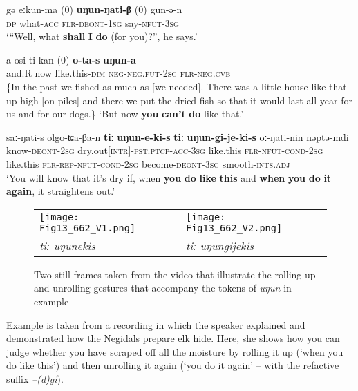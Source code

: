 \documentclass[output=paper]{langscibook}
\begin{document}
\ea \label{ex:pakendorf:34}
\gll gə eːkun-ma \textup{(0)} \textbf{uŋun-ŋati-β} \textup{(0)} gun-ə-n\\
\textsc{dp} what-\textsc{acc} {} \textsc{flr-deont-1sg} {} say-\textsc{nfut-3sg}\\
\glt ‘“Well, what \textbf{shall} \textbf{I} \textbf{do} (for you)?”, he says.’ 
\z

\ea \label{ex:pakendorf:35}
\gll a
	osi
	ti-kan
	\textup{(0)}
	\textbf{o-ta-s}
	\textbf{uŋun-a}\\
	and.R
	now
	like.this-\textsc{dim}
	{}
	\textsc{neg-neg.fut-2sg}
	\textsc{flr-neg.cvb}\\
\glt \{In the past we fished as much as [we needed]. There was a little house like that up high [on piles] and there we put the dried fish so that it would last all year for us and for our dogs.\} ‘But now \textbf{you} \textbf{can't} \textbf{do} like that.’ 
\z


\ea \label{ex:pakendorf:36}
\gll saː-ŋati-s olgo-ʨa-βa-n \textbf{tiː} \textbf{uŋun-e-ki-s} \textbf{tiː} \textbf{uŋun-gi-je-ki-s} oː-ŋati-nin nəptə-mdi\\
know-\textsc{deont-2sg} dry.out\textsc{[intr]-pst.ptcp-acc-3sg} like.this \textsc{flr-nfut-cond-2sg} like.this \textsc{flr-rep-nfut-cond-2sg} become-\textsc{deont-3sg} smooth-\textsc{ints.adj}\\
\glt ‘You will know that it's dry if, when \textbf{you} \textbf{do} \textbf{like} \textbf{this} and \textbf{when} \textbf{you} \textbf{do} \textbf{it} \textbf{again}, it straightens out.’ 
\z


\begin{figure}
\begin{tabularx}{\textwidth}{XX}
\texttt{[image: Fig13\_662\_V1.png]} & 
\texttt{[image: Fig13\_662\_V2.png]}
\\
\textit{tiː uŋunekis} & \textit{tiː uŋungijekis}
\end{tabularx}
\caption{Two still frames taken from the video that illustrate the rolling up and unrolling gestures that accompany the tokens of \textit{uŋun} in example }
\label{fig:pakendorf:13}
\end{figure}

Example  is taken from a recording in which the speaker explained and demonstrated how the Negidals prepare elk hide. Here, she shows how you can judge whether you have scraped off all the moisture by rolling it up (‘when you do like this’) and then unrolling it again (‘you do it again’ – with the refactive suffix \textit{–(d)gi}).
\end{document}
